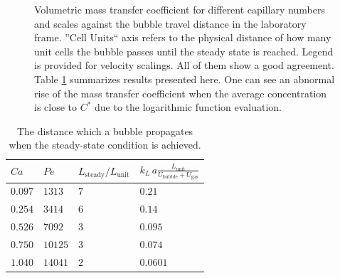 \documentclass{article}
\newcommand{\vol}{k_L\,a}
\newcommand{\lunit}{L_{\mathrm{unit}}}
\newcommand{\ububble}{U_{\mathrm{bubble}}}
\newcommand{\ugas}{U_{\mathrm{gas}}}
\newcommand{\cstar}{C^{*}}
\newcommand{\volnondim}{\vol \frac{\lunit}{\ububble+\ugas}}
\begin{document}
\begin{figure}[htb!]
\caption{Volumetric mass transfer coefficient for different capillary numbers and scales against the
bubble travel distance in the laboratory frame. ''Cell Units`` axis refers to the physical
distance of how many unit cells the bubble passes until the steady state is reached. Legend is provided for velocity scalings. All of them show a good agreement. Table
\ref{table:steady:state:average}
summarizes results presented here. One can see an abnormal rise of the mass transfer coefficient when the average concentration is close to $\cstar$ due to the logarithmic function evaluation. \label{fig:aver:conc:different:capillaries}}
\end{figure}
\begin{table}[htb!]
\begin{tabularx}{\textwidth}{|X|X|X|X|}
\hline
$Ca$    &$Pe$     &$L_{\mathrm{steady}}/\lunit$& $\volnondim$ \\
\hline
$0.097$ &$1313$  &$7$&$0.21$  \\ 
$0.254$ &$3414$  &$6$&$0.14$  \\ 
$0.526$ &$7092$  &$3$&$0.095$ \\
$0.750$ &$10125$ &$3$&$0.074$ \\
$1.040$ &$14041$ &$2$&$0.0601$\\
\hline
\end{tabularx}
\caption{The distance which a bubble propagates when the
steady-state condition is achieved. 
\label{table:steady:state:average}}
\end{table}
\end{document}
